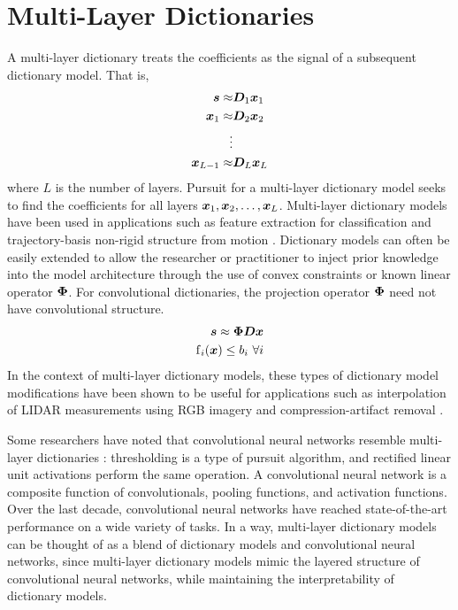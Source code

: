 \section{Multi-Layer Dictionaries}
A multi-layer dictionary treats the coefficients as the signal of a subsequent dictionary model. That is,
\begin{equation}
\begin{split}
\bm{s} \approx & \bm{D}_1\bm{x}_1
\\
\bm{x}_1 \approx & \bm{D}_2\bm{x}_2
\\
\vdots & 
\\
\bm{x}_{L - 1} \approx & \bm{D}_L\bm{x}_L
\end{split}
\end{equation}
where $L$ is the number of layers. Pursuit for a multi-layer dictionary model seeks to find the coefficients for all layers $\bm{x}_1,\bm{x}_2,\hdots,\bm{x}_L$. Multi-layer dictionary models have been used in applications such as feature extraction for classification \cite{chen2013deep}\cite{zeiler2010deconvolutional}\cite{pu2014bayesian} and trajectory-basis non-rigid structure from motion \cite{chodosh2020use}. Dictionary models can often be easily extended to allow the researcher or practitioner to inject prior knowledge into the model architecture through the use of convex constraints or known linear operator $\bm{\Phi}$. For convolutional dictionaries, the projection operator $\bm{\Phi}$ need not have convolutional structure.
%
\begin{equation}
\begin{split}
\bm{s} \approx \bm{\Phi}\bm{D}\bm{x}
\\
\operatorname{f}_i(\bm{x}) \leq b_i \text{ } \forall i
\end{split}
\end{equation}
%
In the context of multi-layer dictionary models, these types of dictionary model modifications have been shown to be useful for applications such as interpolation of LIDAR measurements using RGB imagery \cite{murdock2018deep}\cite{chodosh2018deep} and compression-artifact removal \cite{chodosh2020use}.

Some researchers have noted that convolutional neural networks resemble multi-layer dictionaries \cite{papyan2017convolutional}: thresholding is a type of pursuit algorithm, and rectified linear unit activations perform the same operation. A convolutional neural network is a composite function of convolutionals, pooling functions, and activation functions. Over the last decade, convolutional neural networks have reached state-of-the-art performance on a wide variety of tasks. In a way, multi-layer dictionary models can be thought of as a blend of dictionary models and convolutional neural networks, since multi-layer dictionary models mimic the layered structure of convolutional neural networks, while maintaining the interpretability of dictionary models.



